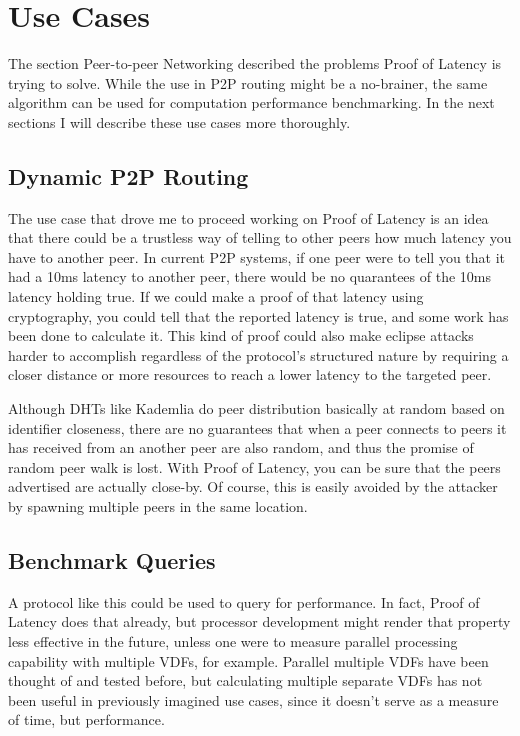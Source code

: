 \section{Use Cases}
The section Peer-to-peer Networking described the problems Proof of Latency is trying to solve. While the use in P2P routing might be a no-brainer, the same algorithm can be used for computation performance benchmarking. In the next sections I will describe these use cases more thoroughly.

\subsection{Dynamic P2P Routing}
The use case that drove me to proceed working on Proof of Latency is an idea that there could be a trustless way of telling to other peers how much latency you have to another peer. In current P2P systems, if one peer were to tell you that it had a 10ms latency to another peer, there would be no quarantees of the 10ms latency holding true. If we could make a proof of that latency using cryptography, you could tell that the reported latency is true, and some work has been done to calculate it. This kind of proof could also make eclipse attacks harder to accomplish regardless of the protocol's structured nature by requiring a closer distance or more resources to reach a lower latency to the targeted peer.


Although DHTs like Kademlia do peer distribution basically at random based on identifier closeness, there are no guarantees that when a peer connects to peers it has received from an another peer are also random, and thus the promise of random peer walk is lost. With Proof of Latency, you can be sure that the peers advertised are actually close-by. Of course, this is easily avoided by the attacker by spawning multiple peers in the same location.

\subsection{Benchmark Queries}
A protocol like this could be used to query for performance. In fact, Proof of Latency does that already, but processor development might render that property less effective in the future, unless one were to measure parallel processing capability with multiple VDFs, for example. Parallel multiple VDFs have been thought of and tested before, but calculating multiple separate VDFs has not been useful in previously imagined use cases, since it doesn't serve as a measure of time, but performance.

